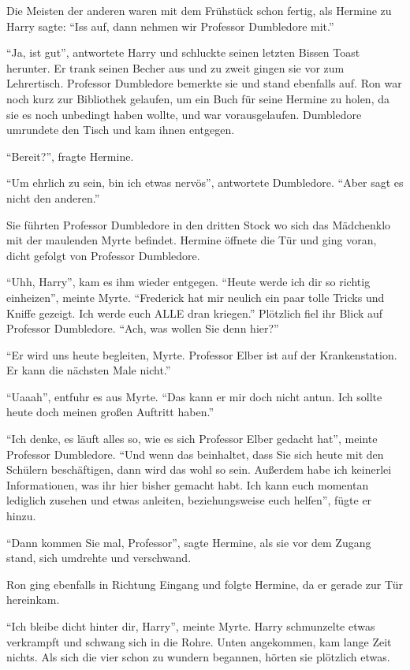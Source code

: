 Die Meisten der anderen waren mit dem Frühstück schon fertig, als Hermine zu Harry sagte: \enquote{Iss auf, dann nehmen wir Professor Dumbledore mit.}

\enquote{Ja, ist gut}, antwortete Harry und schluckte seinen letzten Bissen Toast herunter. Er trank seinen Becher aus und zu zweit gingen sie vor zum Lehrertisch. Professor Dumbledore bemerkte sie und stand ebenfalls auf. Ron war noch kurz zur Bibliothek gelaufen, um ein Buch für seine Hermine zu holen, da sie es noch unbedingt haben wollte, und war vorausgelaufen. Dumbledore umrundete den Tisch und kam ihnen entgegen.

\enquote{Bereit?}, fragte Hermine.

\enquote{Um ehrlich zu sein, bin ich etwas nervös}, antwortete Dumbledore. \enquote{Aber sagt es nicht den anderen.}

Sie führten Professor Dumbledore in den dritten Stock wo sich das Mädchenklo mit der maulenden Myrte befindet. Hermine öffnete die Tür und ging voran, dicht gefolgt von Professor Dumbledore.

\enquote{Uhh, Harry}, kam es ihm wieder entgegen. \enquote{Heute werde ich dir so richtig einheizen}, meinte Myrte. \enquote{Frederick hat mir neulich ein paar tolle Tricks und Kniffe gezeigt. Ich werde euch ALLE dran kriegen.} Plötzlich fiel ihr Blick auf Professor Dumbledore. \enquote{Ach, was wollen Sie denn hier?}

\enquote{Er wird uns heute begleiten, Myrte. Professor Elber ist auf der Krankenstation. Er kann die nächsten Male nicht.}

\enquote{Uaaah}, entfuhr es aus Myrte. \enquote{Das kann er mir doch nicht antun. Ich sollte heute doch meinen großen Auftritt haben.}

\enquote{Ich denke, es läuft alles so, wie es sich Professor Elber gedacht hat}, meinte Professor Dumbledore. \enquote{Und wenn das beinhaltet, dass Sie sich heute mit den Schülern beschäftigen, dann wird das wohl so sein. Außerdem habe ich keinerlei Informationen, was ihr hier bisher gemacht habt. Ich kann euch momentan lediglich zusehen und etwas anleiten, beziehungsweise euch helfen}, fügte er hinzu.

\enquote{Dann kommen Sie mal, Professor}, sagte Hermine, als sie vor dem Zugang stand, sich umdrehte und verschwand.

Ron ging ebenfalls in Richtung Eingang und folgte Hermine, da er gerade zur Tür hereinkam.

\enquote{Ich bleibe dicht hinter dir, Harry}, meinte Myrte. Harry schmunzelte etwas verkrampft und schwang sich in die Rohre. Unten angekommen, kam lange Zeit nichts. Als sich die vier schon zu wundern begannen, hörten sie plötzlich etwas.

